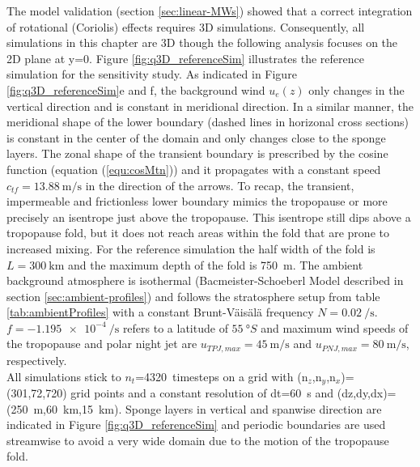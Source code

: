 The model validation (section \ref{sec:linear-MWs}) showed that a correct integration of rotational (Coriolis) effects requires 3D simulations. Consequently, all simulations in this chapter are 3D though the following analysis focuses on the 2D plane at y=0. Figure \ref{fig:q3D_referenceSim} illustrates the reference simulation for the sensitivity study. As indicated in Figure \ref{fig:q3D_referenceSim}e and f, the background wind $u_e(z)$ only changes in the vertical direction and is constant in meridional direction. In a similar manner, the meridional shape of the lower boundary (dashed lines in horizonal cross sections) is constant in the center of the domain and only changes close to the sponge layers. The zonal shape of the transient boundary is prescribed by the cosine function (equation (\ref{equ:cosMtn})) and it propagates with a constant speed $c_{tf}=\SI{13.88}{\meter\per\second}$ in the direction of the arrows. To recap, the transient, impermeable and frictionless lower boundary mimics the tropopause or more precisely an isentrope just above the tropopause. This isentrope still dips above a tropopause fold, but it does not reach areas within the fold that are prone to increased mixing. For the reference simulation the half width of the fold is $L = \SI{300}{\kilo\meter}$ and the maximum depth of the fold is \SI{750}{\meter}. The ambient background atmosphere is isothermal (Bacmeister-Schoeberl Model described in section \ref{sec:ambient-profiles}) and follows the stratosphere setup from table \ref{tab:ambientProfiles} with a constant Brunt-Väisälä frequency $N=\SI{0.02}{\per\second}$. $f = \SI{-1.195e-4}{\per\second}$ refers to a latitude of $\SI{55}{\degree S}$ and maximum wind speeds of the tropopause and polar night jet are $u_{TPJ,max}=\SI{45}{\meter\per\second}$ and $u_{PNJ,max}=\SI{80}{\meter\per\second}$, respectively. \\
All simulations stick to $n_t$=\SI{4320}{timesteps} on a grid with (n$_z$,n$_y$,n$_x$)=(301,72,720) grid points and a constant resolution of dt=\SI{60}{\second} and (dz,dy,dx)=(\SI{250}{\meter},\SI{60}{\kilo\meter},\SI{15}{\kilo\meter}). Sponge layers in vertical and spanwise direction are indicated in Figure \ref{fig:q3D_referenceSim} and periodic boundaries are used streamwise to avoid a very wide domain due to the motion of the tropopause fold.
%
%
